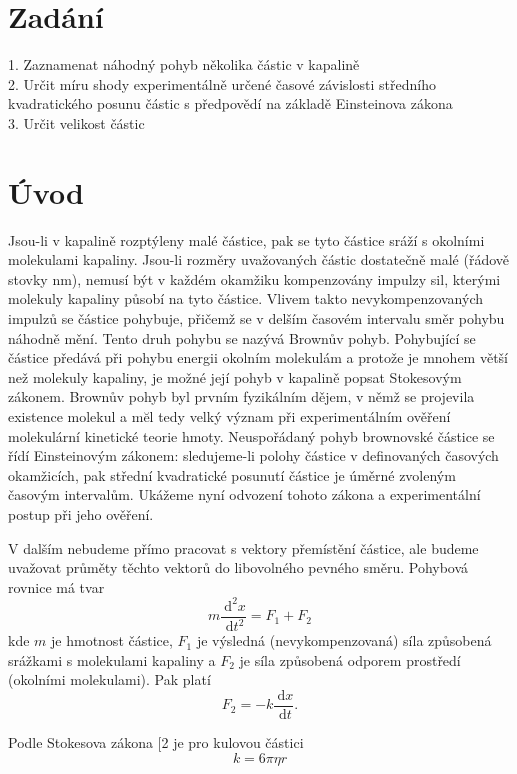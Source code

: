 \documentclass[czech,11pt,a4paper]{article}
\begin{document}
	\begin{multicols}{2}
		\section{Zadání}
		1. Zaznamenat náhodný pohyb několika částic v kapalině\\
		2. Určit míru shody experimentálně určené časové závislosti středního kvadratického posunu částic s předpovědí na základě Einsteinova zákona\\
		3. Určit velikost částic
		\section{Úvod}
		Jsou-li v kapalině rozptýleny malé částice, pak se tyto částice sráží s okolními molekulami kapaliny. Jsou-li rozměry uvažovaných částic dostatečně malé (řádově stovky nm), nemusí být v každém okamžiku kompenzovány impulzy sil, kterými molekuly kapaliny působí na tyto částice. Vlivem takto nevykompenzovaných impulzů se částice pohybuje, přičemž se v delším časovém intervalu směr pohybu náhodně mění. Tento druh pohybu se nazývá Brownův pohyb. Pohybující se částice předává při pohybu energii okolním molekulám a protože je mnohem větší než molekuly kapaliny, je možné její pohyb v kapalině popsat Stokesovým zákonem. Brownův pohyb byl prvním fyzikálním dějem, v němž se projevila existence molekul a mĕl tedy velký význam při experimentálním ověření molekulární kinetické teorie hmoty. Neuspořádaný pohyb brownovské částice se řídí Einsteinovým zákonem: sledujeme-li polohy částice v definovaných časových okamžicích, pak střední kvadratické posunutí částice je úměrné zvoleným časovým intervalům. Ukážeme nyní odvození tohoto zákona a experimentální postup při jeho ověření.
		
		V dalším nebudeme přímo pracovat s vektory přemístění částice, ale budeme uvažovat průměty těchto vektorů do libovolného pevného směru. Pohybová rovnice má tvar
		\begin{equation}
			m \frac{\mathrm{~d}^{2} x}{\mathrm{~d} t^{2}}=F_{1}+F_{2}
		\end{equation}
		kde $m$ je hmotnost částice, $F_{1}$ je výsledná (nevykompenzovaná) síla způsobená srážkami s molekulami kapaliny a $F_{2}$ je síla způsobená odporem prostředí (okolními molekulami). Pak platí
		\begin{equation}
			F_{2}=-k \frac{\mathrm{~d} x}{\mathrm{~d} t} .
		\end{equation}
		
		
		Podle Stokesova zákona [2 je pro kulovou částici
		\begin{equation}
			k=6 \pi \eta r
		\end{equation}
		

\end{multicols}
\end{document}
